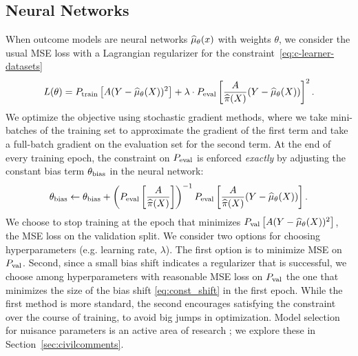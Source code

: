 \subsection{Neural Networks}
\label{sec:methods_nn}
When outcome models are 
neural networks $\widehat{\mu}_\theta(x)$
with weights $\theta$,
we consider the usual MSE loss with a Lagrangian regularizer for the constraint~\eqref{eq:c-learner-datasets}
\vspace{-0.1cm}
\begin{align*}
    L(\theta) = P_{\rm train}\left[A(Y-\what\mu_\theta(X))^2\right] +
\lambda\cdot P_{\rm eval}\left[\frac{A}{\what\pi(X)}(Y-\what\mu_\theta(X))\right]^2.
\vspace{-0.3cm}
\end{align*}
 We optimize the objective using stochastic gradient methods, where we take mini-batches of the training set to approximate the gradient of the first term and take a full-batch gradient on the evaluation set for the second term. At the end of every training epoch, the constraint on $P_{\rm eval}$ is enforced \emph{exactly} by
adjusting the constant bias term $\theta_{\rm bias}$ in the neural network:
\vspace{-0.1cm}
\begin{align}
\label{eq:const_shift}
    \theta_{\rm bias} \gets \theta_{\rm bias} +
    \left( P_{\rm eval}\left[\frac{A}{\what\pi(X)}\right] \right)^{-1} P_{\rm eval}\left[\frac{A}{\what\pi(X)}(Y-\what\mu_\theta(X))\right].
    \vspace{-0.3cm}
\end{align}
 We choose to stop training at the epoch that minimizes $P_{\rm val}  \left[ A(Y-\widehat{\mu}_\theta(X))^2\right]$, the MSE loss on the validation split. We consider two options for choosing  hyperparameters (e.g. learning rate, $\lambda$).
The first option is to minimize MSE on $P_{\rm val}$. Second,
 since a small bias shift indicates a regularizer that is successful,
 we choose
  among hyperparameters with reasonable MSE loss on $P_{\rm val}$ the one that minimizes the size of the bias shift \eqref{eq:const_shift} in the first epoch. 
While the first method is more standard, the second encourages satisfying the constraint over the course of training, to avoid big jumps in optimization. 
Model selection for nuisance parameters is an active area of research \citep{hahn2019bayesian,rolling2013,setodji2017right}; we explore these in Section~\ref{sec:civilcomments}. 
